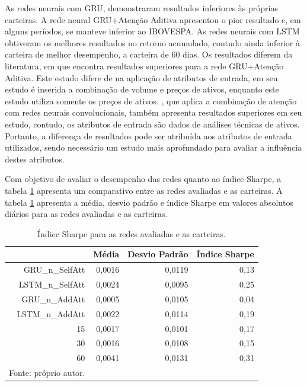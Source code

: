         \ipar As redes neurais com \acrshort{GRU}, demonstraram resultados inferiores às próprias carteiras. A rede neural \acrshort{GRU}+Atenção Aditiva apresentou o pior resultado e, em alguns períodos, se manteve inferior ao \acrshort{IBOVESPA}. As redes neurais com \acrshort{LSTM} obtiveram os melhores resultados no retorno acumulado, contudo ainda inferior à carteira de melhor desempenho, a carteira de 60 dias. Os resultados diferem da literatura, em que  encontra resultados superiores para a rede \acrshort{GRU}+Atenção Aditiva. Este estudo difere de  na aplicação de atributos de entrada, em seu estudo é inserida a combinação de volume e preços de ativos, enquanto este estudo utiliza somente os preços de ativos. , que aplica a combinação de atenção com redes neurais convolucionais, também apresenta resultados superiores em seu estudo, contudo, os atributos de entrada são dados de análises técnicas de ativos. Portanto, a diferença de resultados pode ser atribuída aos atributos de entrada utilizados, sendo necessário um estudo mais aprofundado para avaliar a influência destes atributos.

        \ipar Com objetivo de avaliar o desempenho das redes quanto ao índice Sharpe, a tabela \ref{tab:sharpe} apresenta um comparativo entre as redes avaliadas e as carteiras. A tabela \ref{tab:sharpe} apresenta a média, desvio padrão e índice Sharpe em valores absolutos diários para as redes avaliadas e as carteiras.

        \begin{table}[H]
            \centering
            \caption{Índice Sharpe para as redes avaliadas e as carteiras.}
            \label{tab:sharpe}
            \begin{tabular}{rrrr}
                \hline
                & \textbf{Média} & \textbf{Desvio Padrão} & \textbf{Índice Sharpe} \\ \hline \hline
                GRU\_n\_SelfAtt & 0,0016 & 0,0119 & 0,13 \\
                LSTM\_n\_SelfAtt & 0,0024 & 0,0095 & 0,25 \\
                GRU\_n\_AddAtt & 0,0005 & 0,0105 & 0,04 \\
                LSTM\_n\_AddAtt & 0,0022 & 0,0114 & 0,19 \\
                15 & 0,0017 & 0,0101 & 0,17 \\
                30 & 0,0016 & 0,0108 & 0,15 \\
                60 & 0,0041 & 0,0131 & 0,31 \\
                \hline
                \par \footnotesize Fonte: próprio autor.
            \end{tabular}
        \end{table}

